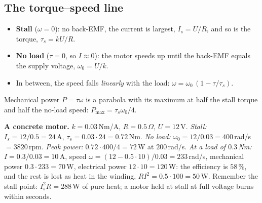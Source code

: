 \subsection*{The torque--speed line}
\begin{itemize}[nosep]
  \item \textbf{Stall} ($\omega=0$): no back-EMF, the current is largest, $I_s=U/R$, and so is the torque, $\tau_s=kU/R$.
  \item \textbf{No load} ($\tau=0$, so $I\approx0$): the motor speeds up until the back-EMF equals the supply voltage, $\omega_0=U/k$.
  \item In between, the speed falls \emph{linearly} with the load: $\omega=\omega_0\,(1-\tau/\tau_s)$.
\end{itemize}
Mechanical power $P=\tau\omega$ is a parabola with its maximum at half the stall torque and half the no-load speed: $P_\text{max}=\tau_s\omega_0/4$.
\begin{center}
\label{fig:hw6_ts}
\end{center}
\begin{example}
\textbf{A concrete motor.} $k=0.03$\,Nm/A, $R=0.5\,\Omega$, $U=12$\,V. \emph{Stall:} $I_s=12/0.5=24$\,A, $\tau_s=0.03\cdot24=0.72$\,Nm. \emph{No load:} $\omega_0=12/0.03=400$\,rad/s $=3820$\,rpm. \emph{Peak power:} $0.72\cdot400/4=72$\,W at $200$\,rad/s. \emph{At a load of $0.3$\,Nm:} $I=0.3/0.03=10$\,A, speed $\omega=(12-0.5\cdot10)/0.03=233$\,rad/s, mechanical power $0.3\cdot233=70$\,W, electrical power $12\cdot10=120$\,W: the efficiency is $58\,\%$, and the rest is lost as heat in the winding, $RI^2=0.5\cdot100=50$\,W. Remember the stall point: $I_s^2R=288$\,W of pure heat; a motor held at stall at full voltage burns within seconds.
\end{example}

